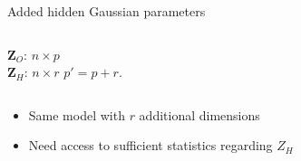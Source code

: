 \documentclass[11pt]{beamer}
\newcommand\Sigmab{{\boldsymbol{\Sigma}}}
\newcommand\Omegab{{\boldsymbol{\Omega}}}
\newcommand{\Zbf}{{\boldsymbol{Z}}}
\newcommand{\emphase}[1]{\textcolor{Complement}{#1}}
\newcommand{\Ncal}{\mathcal{N}}
\begin{document}
\begin{frame}{Added hidden Gaussian parameters}
\begin{columns}
\begin{column}{0.5\linewidth}
       \hspace{0.85cm}  $\Zbf_O$: $n\times p$\\
       \hspace{0.85cm}   \emphase{$\Zbf_H$: $n\times r$} \hspace{0.8cm} \emphase{$p'=p+r$.}
     \end{column}
     \end{columns}
     \vspace{0.2cm}
     \pause
     \begin{itemize}
     \item Same model with $r$ additional dimensions
     \item Need access to sufficient statistics regarding $Z_H$ 
     \end{itemize}
\end{frame}
%
% 
%  
%  
\end{document}
